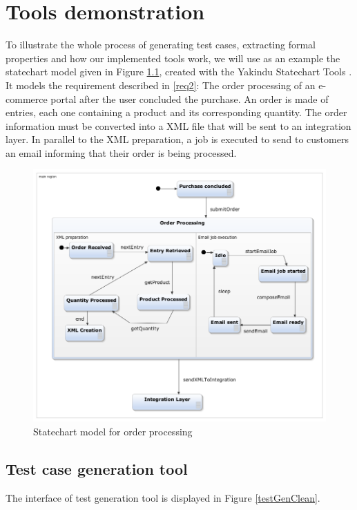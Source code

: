 \chapter{Tools demonstration}
\label{cap:casestudy}

To illustrate the whole process of generating test cases, extracting formal properties and how our implemented tools work, we will use as an example the statechart model given in Figure \ref{webOrderProc}, created with the Yakindu Statechart Tools \cite{Yakindu}. It models the requirement described in \ref{req2}: The order processing of an e-commerce portal after the user concluded the purchase. An order is made of entries, each one containing a product and its corresponding quantity. The order information must be converted into a XML file that will be sent to an integration layer. In parallel to the XML preparation, a job is executed to send to customers an email informing that their order is being processed.

\begin{figure}[htb]
\centering
\includegraphics[width=15cm]{figuras/webOrderProc}
\caption{\label{webOrderProc}Statechart model for order processing}
\end{figure}

\section{Test case generation tool}

The interface of test generation tool is displayed in Figure \ref{testGenClean}.

